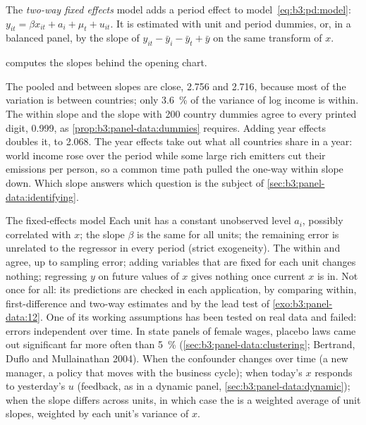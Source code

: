 \begin{definition}\label{def:b3:panel-data:twfe}
The \emph{two-way fixed effects} model adds a period effect to
model~\eqref{eq:b3:pd:model}: $y_{it} = \beta x_{it} + a_i + \mu_t + u_{it}$.
It is estimated with unit and period dummies, or, in a balanced panel, by the
slope of $y_{it} - \bar y_i - \bar y_t + \bar y$ on the same transform of $x$.
\end{definition}

 computes the slopes behind the opening chart.

\label{lst:b3:panel-data:co2}

\label{out:b3:panel-data:co2}

The pooled and between slopes are close, 2.756 and 2.716, because most of the
variation is between countries; only 3.6~\% of the variance of log income is
within. %
The within slope and the slope with 200 country dummies agree to every printed
digit, 0.999, as \cref{prop:b3:panel-data:dummies} requires. Adding year
effects doubles it, to 2.068. %
The year effects take out what all countries share in a year: world income
rose over the period while some large rich emitters cut their emissions per
person, so a common time path pulled the one-way within slope down. Which
slope answers which question is the subject of
\cref{sec:b3:panel-data:identifying}.

\begin{model}{The fixed-effects model}
\assumes Each unit has a constant unobserved level $a_i$, possibly correlated
with $x$; the slope $\beta$ is the same for all units; the remaining error is
unrelated to the regressor in every period (strict exogeneity).
\predicts The within and  agree, up to sampling
error; adding variables that are fixed for each unit changes nothing;
regressing $y$ on future values of $x$ gives nothing once current $x$ is in.
\tested Not once for all: its predictions are checked in each application,
by comparing within, first-difference and two-way estimates and by the lead
test of \cref{exo:b3:panel-data:12}. One of its working assumptions has been
tested on real data and failed: errors independent over time. In state panels
of female wages, placebo laws came out significant far more often than 5~\%
(\cref{sec:b3:panel-data:clustering}; Bertrand, Duflo and Mullainathan 2004). %
\breaks When the confounder changes over time (a new manager, a policy that
moves with the business cycle); when today's $x$ responds to yesterday's $u$
(feedback, as in a dynamic panel, \cref{sec:b3:panel-data:dynamic}); when
the slope differs across units, in which case the  is a
weighted average of unit slopes, weighted by each unit's variance of $x$.
\end{model}

